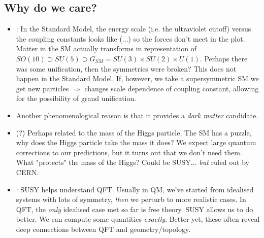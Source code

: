 \documentclass{article}
\begin{document}
\subsection{Why do we care?}
\begin{itemize}
    \item {}: In the Standard Model, the energy scale (i.e. the ultraviolet cutoff) versus the coupling constants looks like (...) so the forces don't meet in the plot. 
    Matter in the SM actually transforms in representation of $SO(10) \supset SU(5) \supset G_{SM}=SU(3) \times SU(2) \times U(1)$. Perhaps there was some unification, then the symmetries were broken? This does not happen in the Standard Model.
    If, however, we take a supersymmetric SM we get new particles $\Rightarrow$ changes scale dependence of coupling constant, allowing for the possibility of grand unification. 
    \item Another phenomenological reason is that it provides a \emph{dark matter} candidate. 
    \item (?) Perhaps related to the mass of the Higgs particle. The SM has a puzzle, why does the Higgs particle take the mass it does? We expect large quantum corrections to our predictions, but it turns out that we don't need them. What "protects" the mass of the Higgs? Could be SUSY... \emph{but} ruled out by CERN. 
    \item {}: SUSY helps understand QFT. Usually in QM, we've started from idealised systems with lots of symmetry, \emph{then} we perturb to more realistic cases. In QFT, the \emph{only} idealised case met so far is free theory. 
    SUSY allows us to do better. We can compute some quantities \emph{exactly}. Better yet, these often reveal deep connections between QFT and geometry/topology. 
\end{itemize}

\end{document}
